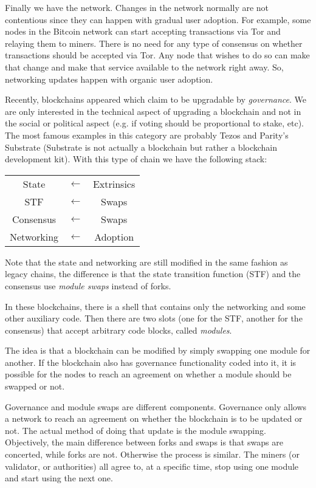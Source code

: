 \documentclass[conference]{IEEEtran}
\begin{document}
Finally we have the network. Changes in the network normally are not contentious since they can happen with gradual user adoption. For example, some nodes in the Bitcoin network can start accepting transactions via Tor and relaying them to miners. There is no need for any type of consensus on whether transactions should be accepted via Tor. Any node that wishes to do so can make that change and make that service available to the network right away. So, networking updates happen with organic user adoption.

Recently, blockchains appeared which claim to be upgradable by \textit{governance}. We are only interested in the technical aspect of upgrading a blockchain and not in the social or political aspect (e.g. if voting should be proportional to stake, etc). The most famous examples in this category are probably Tezos \cite{goodman2014tezos} and Parity's Substrate (Substrate is not actually a blockchain but rather a blockchain development kit). With this type of chain we have the following stack:

\begin{center}
	\begin{tabular}{c c c}
		State & $\leftarrow$ & Extrinsics\\
		\cline{1-1}
		STF & $\leftarrow$ & Swaps\\
		\cline{1-1}
		Consensus & $\leftarrow$ & Swaps\\
		\cline{1-1}
		Networking & $\leftarrow$ & Adoption
	\end{tabular}
\end{center}

Note that the state and networking are still modified in the same fashion as legacy chains, the difference is that the state transition function (STF) and the consensus use \textit{module swaps} instead of forks.

In these blockchains, there is a shell that contains only the networking and some other auxiliary code. Then there are two slots (one for the STF, another for the consensus) that accept arbitrary code blocks, called \textit{modules}.

The idea is that a blockchain can be modified by simply swapping one module for another. If the blockchain also has governance functionality coded into it, it is possible for the nodes to reach an agreement on whether a module should be swapped or not.

Governance and module swaps are different components. Governance only allows a network to reach an agreement on whether the blockchain is to be updated or not. The actual method of doing that update is the module swapping. Objectively, the main difference between forks and swaps is that swaps are concerted, while forks are not. Otherwise the process is similar. The miners (or validator, or authorities) all agree to, at a specific time, stop using one module and start using the next one.
\end{document}
